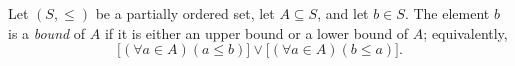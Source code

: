 \begin{definition}[Bound]
\label{def:bound}
Let $(S,\leq)$ be a partially ordered set, let $A\subseteq S$, and let
$b\in S$. The element $b$ is a \emph{bound} of $A$ if it is either an
upper bound or a lower bound of $A$; equivalently,
\[
  \bigl[(\forall a\in A)(a\leq b)\bigr]
  \lor
  \bigl[(\forall a\in A)(b\leq a)\bigr].
\]
\end{definition}